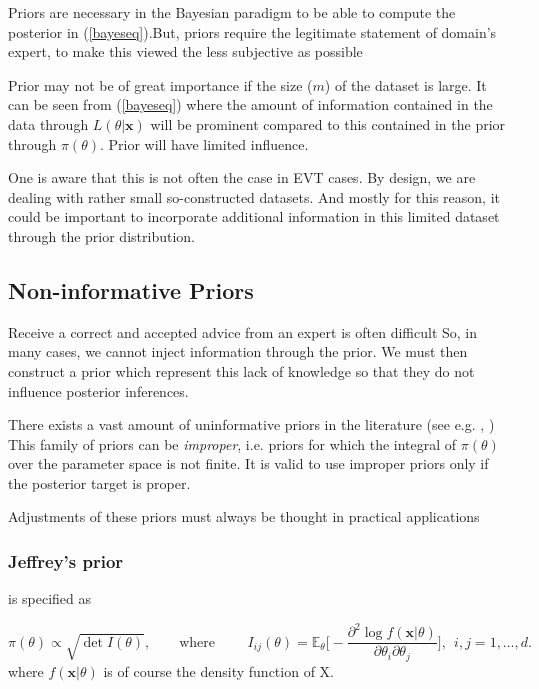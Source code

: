 \documentclass[11pt,a4paper,openany ]{book}
\begin{document}
Priors are necessary in the Bayesian paradigm to be able to compute the posterior in  (\ref{bayeseq}).But, priors require the legitimate statement of domain's expert, to make this viewed the less subjective as possible

Prior may not be of great importance if the size ($m$) of the dataset is large. It can be seen from (\ref{bayeseq}) where the amount of information contained in the data through $L(\theta|\boldsymbol{x})$ will be prominent compared to this contained in the prior through $\pi(\theta)$. Prior will have limited influence.

One is aware that this is not often the case in EVT cases. By design, we are dealing with rather small so-constructed datasets. And mostly for this reason, it could be important to incorporate additional information in this limited dataset through the prior distribution.

\subsection{Non-informative Priors}

Receive a correct and accepted advice from an expert is often difficult
So, in many cases, we cannot inject information through the prior. 
We must then construct a prior which represent this lack of knowledge so that  they do not influence posterior inferences. 

There exists a vast amount of uninformative priors in the literature (see e.g. \cite{yang_catalog_1996}, \cite{ni_noninformative_2003})
This family of priors can be \emph{improper}, i.e. priors for which the integral of $\pi(\theta)$ over the parameter space is not finite. It is valid to use improper priors only if the posterior target is proper. 

Adjustments of these priors must always be thought in practical applications
\subsubsection*{Jeffrey's prior} 
is specified as 

\begin{equation}
\pi(\theta)\propto \sqrt{\det I(\theta)}, \qquad \text{where }\quad\quad I_{ij}(\theta)=\mathbb{E}_{\theta}\Bigg[-\frac{\partial^2\log f(\boldsymbol{x}|\theta)}{\partial\theta_i\partial\theta_j}\Bigg], \ \ i,j= 1,\dots,d.
\end{equation}
where $f(\boldsymbol{x}|\theta)$ is of course the density function of X.
\end{document}

